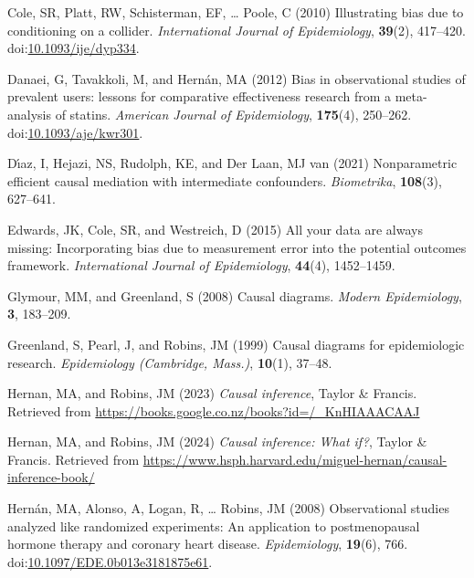 \documentclass[
  singlecolumn]{article}
\newlength{\cslhangindent}
\newenvironment{CSLReferences}[2] %
 {\begin{list}{}{%
  \setlength{\itemindent}{0pt}
  \setlength{\leftmargin}{0pt}
  \setlength{\parsep}{0pt}
  \ifodd #1
   \setlength{\leftmargin}{\cslhangindent}
   \setlength{\itemindent}{-1\cslhangindent}
  \fi
  \setlength{\itemsep}{#2\baselineskip}}}
 {\end{list}}
\begin{document}
\begin{CSLReferences}{1}{0}
Cole, SR, Platt, RW, Schisterman, EF, \ldots{} Poole, C (2010)
Illustrating bias due to conditioning on a collider. \emph{International
Journal of Epidemiology}, \textbf{39}(2), 417--420.
doi:\href{https://doi.org/10.1093/ije/dyp334}{10.1093/ije/dyp334}.

Danaei, G, Tavakkoli, M, and Hernán, MA (2012) Bias in observational
studies of prevalent users: lessons for comparative effectiveness
research from a meta-analysis of statins. \emph{American Journal of
Epidemiology}, \textbf{175}(4), 250--262.
doi:\href{https://doi.org/10.1093/aje/kwr301}{10.1093/aje/kwr301}.

Dı́az, I, Hejazi, NS, Rudolph, KE, and Der Laan, MJ van (2021)
Nonparametric efficient causal mediation with intermediate confounders.
\emph{Biometrika}, \textbf{108}(3), 627--641.

Edwards, JK, Cole, SR, and Westreich, D (2015) All your data are always
missing: Incorporating bias due to measurement error into the potential
outcomes framework. \emph{International Journal of Epidemiology},
\textbf{44}(4), 1452--1459.

Glymour, MM, and Greenland, S (2008) Causal diagrams. \emph{Modern
Epidemiology}, \textbf{3}, 183--209.

Greenland, S, Pearl, J, and Robins, JM (1999) Causal diagrams for
epidemiologic research. \emph{Epidemiology (Cambridge, Mass.)},
\textbf{10}(1), 37--48.

Hernan, MA, and Robins, JM (2023) \emph{Causal inference}, Taylor \&
Francis. Retrieved from
\url{https://books.google.co.nz/books?id=/_KnHIAAACAAJ}

Hernan, MA, and Robins, JM (2024) \emph{Causal inference: What if?},
Taylor \& Francis. Retrieved from
\url{https://www.hsph.harvard.edu/miguel-hernan/causal-inference-book/}

Hernán, MA, Alonso, A, Logan, R, \ldots{} Robins, JM (2008)
Observational studies analyzed like randomized experiments: An
application to postmenopausal hormone therapy and coronary heart
disease. \emph{Epidemiology}, \textbf{19}(6), 766.
doi:\href{https://doi.org/10.1097/EDE.0b013e3181875e61}{10.1097/EDE.0b013e3181875e61}.


\end{CSLReferences}
\end{document}
